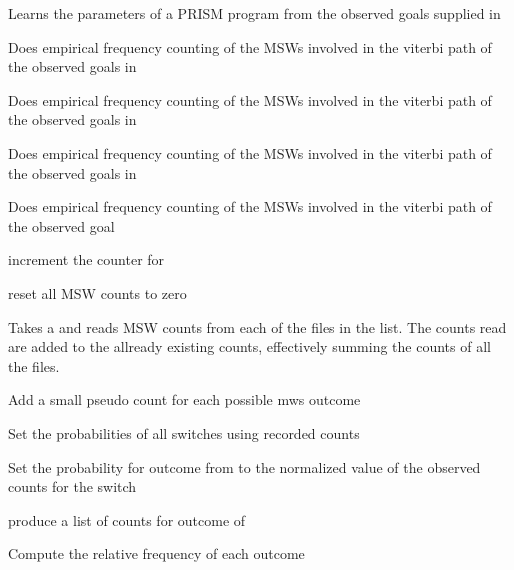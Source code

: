 \begin{description}
Learns the parameters of a PRISM program from the observed goals
supplied in 

Does empirical frequency counting of the MSWs involved
in the viterbi path of the observed goals in  

Does empirical frequency counting of the MSWs involved
in the viterbi path of the observed goals in  

Does empirical frequency counting of the MSWs involved
in the viterbi path of the observed goals in  

Does empirical frequency counting of the MSWs involved
in the viterbi path of the observed goal 

increment the counter for  

reset all MSW counts to zero 

Takes a  and reads MSW counts from each of the files
in the list. The counts read are added to the allready existing
counts, effectively summing the counts of all the files.


Add a small pseudo count for each possible mws outcome

Set the probabilities of all switches using recorded counts

Set the probability for outcome from  to the normalized value
of the observed counts for the switch

produce a list of counts for outcome of  

Compute the relative frequency of each outcome 
\end{description}

